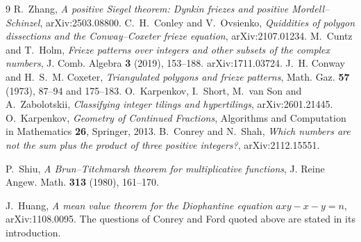 \documentclass[11pt]{article}
\theoremstyle{plain}
\theoremstyle{definition}
\begin{document}
\begin{thebibliography}{9}
 R.~Zhang, \emph{A positive Siegel theorem: Dynkin friezes and positive
Mordell--Schinzel}, arXiv:2503.08800.
 C.~H.~Conley and V.~Ovsienko, \emph{Quiddities of polygon dissections and the
Conway--Coxeter frieze equation}, arXiv:2107.01234.
 M.~Cuntz and T.~Holm, \emph{Frieze patterns over integers and other subsets of
the complex numbers}, J. Comb. Algebra \textbf{3} (2019), 153--188. arXiv:1711.03724.
 J.~H. Conway and H.~S.~M. Coxeter, \emph{Triangulated polygons and frieze
patterns}, Math. Gaz. \textbf{57} (1973), 87--94 and 175--183.
 O.~Karpenkov, I.~Short, M.~van Son and A.~Zabolotskii, \emph{Classifying
integer tilings and hypertilings}, arXiv:2601.21445.
 O.~Karpenkov, \emph{Geometry of Continued Fractions}, Algorithms and
Computation in Mathematics \textbf{26}, Springer, 2013.
 B.~Conrey and N.~Shah, \emph{Which numbers are not the sum plus the
product of three positive integers?}, arXiv:2112.15551.

 P.~Shiu, \emph{A Brun--Titchmarsh theorem for multiplicative functions},
J. Reine Angew. Math. \textbf{313} (1980), 161--170.

 J.~Huang, \emph{A mean value theorem for the Diophantine equation
$axy-x-y=n$}, arXiv:1108.0095. The questions of Conrey and Ford quoted above are stated in
its introduction.

\end{thebibliography}
\end{document}

